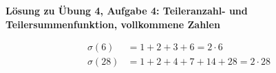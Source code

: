 \textbf{Lösung zu Übung 4, Aufgabe 4: Teileranzahl- und Teilersummenfunktion, vollkommene Zahlen}

\begin{loesung}
\begin{align*}
\sigma(6) &= 1 + 2 + 3 + 6 = 2 \cdot 6\\
\sigma(28) &= 1 + 2 + 4 + 7 + 14 + 28 = 2 \cdot 28
\end{align*}
\end{loesung}
